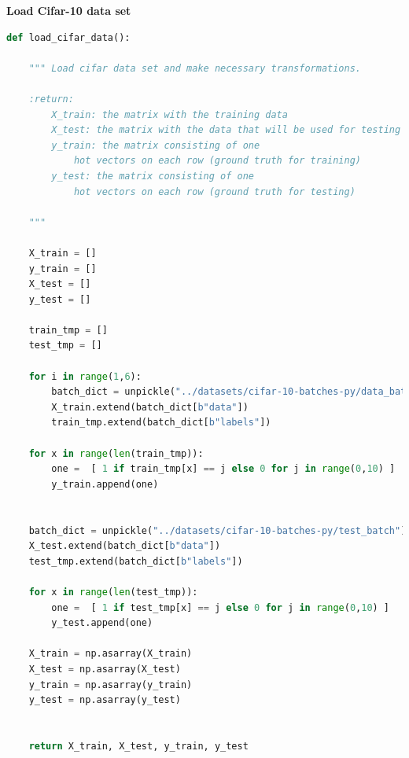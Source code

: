 \documentclass[11pt]{article}
\begin{document}
\newpage
\noindent \textbf {Load Cifar-10 data set}
\begin{lstlisting}[language = Python]
def load_cifar_data():
    
    """ Load cifar data set and make necessary transformations. 
    
    :return:
        X_train: the matrix with the training data
        X_test: the matrix with the data that will be used for testing
        y_train: the matrix consisting of one 
            hot vectors on each row (ground truth for training)
        y_test: the matrix consisting of one
            hot vectors on each row (ground truth for testing)
            
    """
    
    X_train = []
    y_train = []
    X_test = []
    y_test = []
    
    train_tmp = []
    test_tmp = []

    for i in range(1,6):
        batch_dict = unpickle("../datasets/cifar-10-batches-py/data_batch_%d" %i)
        X_train.extend(batch_dict[b"data"])
        train_tmp.extend(batch_dict[b"labels"])
        
    for x in range(len(train_tmp)):
        one =  [ 1 if train_tmp[x] == j else 0 for j in range(0,10) ]
        y_train.append(one)


    batch_dict = unpickle("../datasets/cifar-10-batches-py/test_batch")
    X_test.extend(batch_dict[b"data"])
    test_tmp.extend(batch_dict[b"labels"])
    
    for x in range(len(test_tmp)):
        one =  [ 1 if test_tmp[x] == j else 0 for j in range(0,10) ]
        y_test.append(one)

    X_train = np.asarray(X_train)
    X_test = np.asarray(X_test)
    y_train = np.asarray(y_train)
    y_test = np.asarray(y_test)
    
    
    return X_train, X_test, y_train, y_test
\end{lstlisting}
\end{document}
